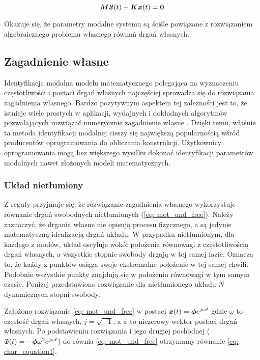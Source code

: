 \begin{equation} \label{eq: mot_und_free}
\bm{M} \bm{\ddot{x}}(t) +\bm{Kx}(t) = \bm{0}
\end{equation}


Okazuje się, że parametry modalne systemu są ściśle powiązane z rozwiązaniem algebraicznego problemu własnego równań drgań własnych. 

\subsection{Zagadnienie własne} \label{sect:modal_analysis}
Identyfikacja modalna modelu matematycznego polegająca na wyznaczeniu częstotliwości i postaci drgań własnych najczęściej sprowadza się do rozwiązania zagadnienia własnego. Bardzo pozytywnym aspektem tej zależności jest to, że istnieje wiele prostych w aplikacji, wydajnych i dokładnych algorytmów pozwalających rozwiązać numerycznie zagadnienie własne \parencite{Golub2013}. Dzięki temu, właśnie ta metoda identyfikacji modalnej cieszy się największą popularnością wśród producentów oprogramowania do obliczania konstrukcji. Użytkownicy oprogramowania mogą bez większego wysiłku dokonać identyfikacji parametrów modalnych nawet złożonych modeli matematycznych. 
\subsubsection{Układ nietłumiony}
Z reguły przyjmuje się, że rozwiązanie zagadnienia własnego wykorzystuje równanie drgań swobodnych nietłumionych (\ref{eq: mot_und_free}). Należy zaznaczyć, że drgania własne nie opisują procesu fizycznego, a są jedynie matematyczną idealizacją drgań układu. W przypadku nietłumionym, dla każdego z modów, układ oscyluje wokół położenia równowagi z częstotliwością drgań własnych, a wszystkie stopnie swobody drgają w tej samej fazie. Oznacza to, że każdy z punktów osiąga swoje ekstremalne położenie w tej samej chwili. Podobnie wszystkie punkty znajdują się w położeniu równowagi w tym samym czasie. Poniżej przedstawiono rozwiązanie dla nietłumionego układu $N$ dynamicznych stopni swobody.

Założono rozwiązanie \ref{eq: mot_und_free} w postaci $\bm{x}(t)=\bm{\phi}e^{j\omega t}$ gdzie $\omega$ to częstość drgań własnych, $j=\sqrt{-1}$, a $\phi$ to niezerowy wektor postaci drgań własnych. Po podstawieniu rozwiązania i jego drugiej pochodnej ($\bm{\ddot{x}}(t)=-\bm{\phi} \omega^2 e^{j\omega t}$) do równia \ref{eq: mot_und_free} otrzymamy równanie \ref{eq: char_equation1}.

